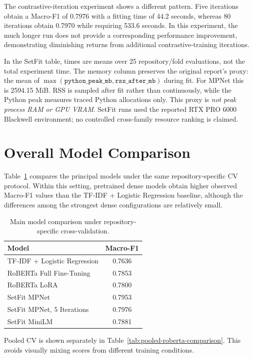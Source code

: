 The contrastive-iteration experiment shows a different pattern. Five iterations obtain a Macro-F1 of 0.7976 with a fitting time of 44.2 seconds, whereas 80 iterations obtain 0.7970 while requiring 533.6 seconds. In this experiment, the much longer run does not provide a corresponding performance improvement, demonstrating diminishing returns from additional contrastive-training iterations.

In the SetFit table, times are means over 25 repository/fold evaluations, not the total experiment time. The memory column preserves the original report's proxy: the mean of $\max(\texttt{python\_peak\_mb},\texttt{rss\_after\_mb})$ during fit. For MPNet this is 2594.15 MiB. RSS is sampled after fit rather than continuously, while the Python peak measures traced Python allocations only. This proxy is \emph{not peak process RAM or GPU VRAM}. SetFit runs used the reported RTX PRO 6000 Blackwell environment; no controlled cross-family resource ranking is claimed.

\section{Overall Model Comparison}
Table~\ref{tab:cv-main-comparison} compares the principal models under the same repository-specific CV protocol. Within this setting, pretrained dense models obtain higher observed Macro-F1 values than the TF-IDF + Logistic Regression baseline, although the differences among the strongest dense configurations are relatively small.

\begin{table}[H]
\centering
\caption{Main model comparison under repository-specific cross-validation.}
\label{tab:cv-main-comparison}
\begin{tabular}{lc}
\toprule
\textbf{Model} & \textbf{Macro-F1} \\
\midrule
TF-IDF + Logistic Regression & 0.7636 \\
RoBERTa Full Fine-Tuning & 0.7853 \\
RoBERTa LoRA & 0.7800 \\
SetFit MPNet & 0.7953 \\
SetFit MPNet, 5 Iterations & 0.7976 \\
SetFit MiniLM & 0.7881 \\
\bottomrule
\end{tabular}
\end{table}

Pooled CV is shown separately in Table~\ref{tab:pooled-roberta-comparison}. This avoids visually mixing scores from different training conditions.

